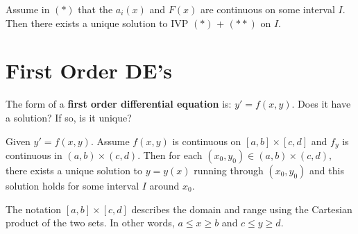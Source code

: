 \documentclass[../main.tex]{subfiles}
\begin{document}
\begin{theorem}[]
    Assume in \( (*) \) that the \(a_{i}(x) \) and \( F(x) \) are continuous on some interval \( I
     \).
    Then there exists a unique solution to IVP \( (*) \) + \( (**) \) on \( I \).
\end{theorem}


\section{First Order DE's}

The form of a \textbf{first order differential equation} is: \( y' = f(x,y) \). Does it have a solution? If so, is it unique?

\begin{theorem}[]
    Given \( y'=f(x,y) \). Assume \( f(x,y) \) is continuous on \( [a,b] \times [c,d] \) and \( f_{y} \) is continuous in \( (a,b) \times (c,d) \).
    Then for each \( (x_0,y_0) \in (a,b) \times (c,d),\, \) there exists a unique solution to \( y=y(x) \) running through \( (x_0,y_0) \) and this solution holds for some interval \( I \) around \( x_0 \).
\end{theorem}

\begin{note}
    The notation \( [a,b] \times [c,d] \) describes the domain and range using the Cartesian product of the two sets. In other words, \(a \leq x \geq b \) and \( c \leq y \geq d \).
\end{note}

\end{document}
